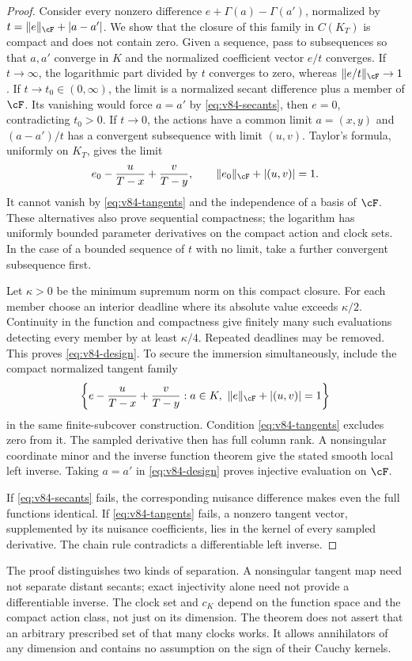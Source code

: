 \begin{proof}
Consider every nonzero difference $e+\Gamma(a)-\Gamma(a')$, normalized
by $t=\|e\|_{\cF}+|a-a'|$. We show that the closure of this family
in $C(K_T)$ is compact and does not contain zero. Given a sequence,
pass to subsequences so that $a,a'$ converge in $K$ and the normalized
coefficient vector $e/t$ converges. If $t\to\infty$, the logarithmic
part divided by $t$ converges to zero, whereas $\|e/t\|_{\cF}\to1$.
If $t\to t_0\in(0,\infty)$, the limit is a normalized secant
difference plus a member of $\cF$. Its vanishing would force $a=a'$
by \eqref{eq:v84-secants}, then $e=0$, contradicting $t_0>0$.
If $t\to0$, the actions have a common limit $a=(x,y)$ and
$(a-a')/t$ has a convergent subsequence with limit $(u,v)$. Taylor's
formula, uniformly on $K_T$, gives the limit
\[
 e_0-\frac{u}{T-x}+\frac{v}{T-y},\qquad
       \|e_0\|_{\cF}+|(u,v)|=1.
\]
It cannot vanish by \eqref{eq:v84-tangents} and the independence of a
basis of $\cF$. These alternatives also prove sequential compactness;
the logarithm has uniformly bounded parameter derivatives on the
compact action and clock sets. In the case of a bounded sequence of
$t$ with no limit, take a further convergent subsequence first.

Let $\kappa>0$ be the minimum supremum norm on this compact closure.
For each member choose an interior deadline where its absolute value
exceeds $\kappa/2$. Continuity in the function and compactness give
finitely many such evaluations detecting every member by at least
$\kappa/4$. Repeated deadlines may be removed. This proves
\eqref{eq:v84-design}. To secure the immersion simultaneously, include
the compact normalized tangent family
\[
 \left\{e-\frac{u}{T-x}+\frac{v}{T-y}:
 a\in K,\ \|e\|_{\cF}+|(u,v)|=1\right\}
\]
in the same finite-subcover construction. Condition
\eqref{eq:v84-tangents} excludes zero from it. The sampled derivative
then has full column rank. A nonsingular coordinate minor and the
inverse function theorem give the stated smooth local left inverse.
Taking $a=a'$ in \eqref{eq:v84-design} proves injective evaluation on
$\cF$.

If \eqref{eq:v84-secants} fails, the corresponding nuisance difference
makes even the full functions identical. If
\eqref{eq:v84-tangents} fails, a nonzero tangent vector, supplemented
by its nuisance coefficients, lies in the kernel of every sampled
derivative. The chain rule contradicts a differentiable left inverse.
\end{proof}
The proof distinguishes two kinds of separation. A nonsingular tangent
map need not separate distant secants; exact injectivity alone need
not provide a differentiable inverse. The clock set and $c_K$ depend
on the function space and the compact action class, not just on its
dimension. The theorem does not assert that an arbitrary prescribed
set of that many clocks works. It allows annihilators of any dimension
and contains no assumption on the sign of their Cauchy kernels.

